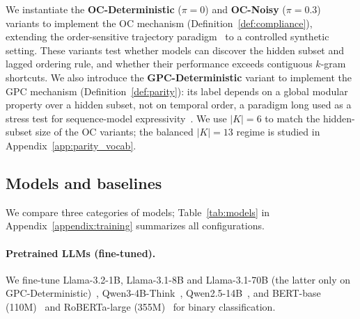 \documentclass[fullpaper]{nldl}
\theoremstyle{plain}
\theoremstyle{definition}
\theoremstyle{remark}
\begin{document}
We instantiate the \textbf{OC-Deterministic} ($\pi=0$) and \textbf{OC-Noisy} ($\pi=0.3$) variants to implement the OC mechanism (Definition~\ref{def:compliance}), extending the order-sensitive trajectory paradigm~\citep{edelman2026order_specific_ehr,placido2023pancreatic_trajectories} to a controlled synthetic setting. These variants test whether models can discover the hidden subset and lagged ordering rule, and whether their performance exceeds contiguous $k$-gram shortcuts. We also introduce the \textbf{GPC-Deterministic} variant to implement the GPC mechanism (Definition~\ref{def:parity}): its label depends on a global modular property over a hidden subset, not on temporal order, a paradigm long used as a stress test for sequence-model expressivity~\citep{hahn-2020-theoretical}. We use $|K|=6$ to match the hidden-subset size of the OC variants; the balanced $|K|=13$ regime is studied in Appendix~\ref{app:parity_vocab}.

\begin{table}[tb]
\centering
\caption{Dataset characteristics for the sequential classification task. $N_{train}$ indicates training size.}
\label{tab:datasets}
\end{table}

\subsection{Models and baselines}
\label{subsec:models}

We compare three categories of models; Table~\ref{tab:models} in Appendix~\ref{appendix:training} summarizes all configurations.

\paragraph{Pretrained LLMs (fine-tuned).} We fine-tune Llama-3.2-1B, Llama-3.1-8B and Llama-3.1-70B (the latter only on GPC-Deterministic)~\citep{touvron2023llama, grattafiori2024llama3}, Qwen3-4B-Think~\citep{bai2023qwen}, Qwen2.5-14B~\citep{qwen2.5, qwen2}, and BERT-base (110M)~\citep{devlin2019bert} and RoBERTa-large (355M)~\citep{liu2019robertarobustlyoptimizedbert} for binary classification.
\end{document}
